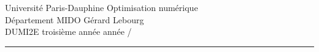 \noindent
Universit\'e Paris-Dauphine     \hfill      Optimisation num\'erique\\
D\'epartement MIDO              \hfill      G\'erard Lebourg\\
DUMI2E troisi\`eme ann\'ee      \hfill      ann\'ee /

\medskip

\hrule

\medskip
